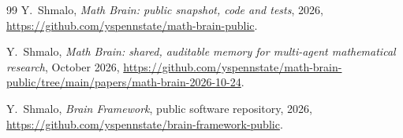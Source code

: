 \documentclass[11pt]{amsart}
\numberwithin{equation}{section}
\begin{document}
\begin{thebibliography}{99}
 Y.~Shmalo, \emph{Math Brain: public snapshot, code and tests}, 2026, \url{https://github.com/yspennstate/math-brain-public}.

 Y.~Shmalo, \emph{Math Brain: shared, auditable memory for multi-agent mathematical research}, October 2026, \url{https://github.com/yspennstate/math-brain-public/tree/main/papers/math-brain-2026-10-24}.

 Y.~Shmalo, \emph{Brain Framework}, public software repository, 2026, \url{https://github.com/yspennstate/brain-framework-public}.

\end{thebibliography}
\end{document}
